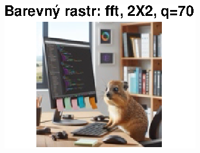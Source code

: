 \begin{figure}[H]
\begin{minipage}[b]{0.3\textwidth}
        \includegraphics[width=\textwidth]{images/barevny_fft_2X2_q70.eps}
    \end{minipage}
\end{figure}

